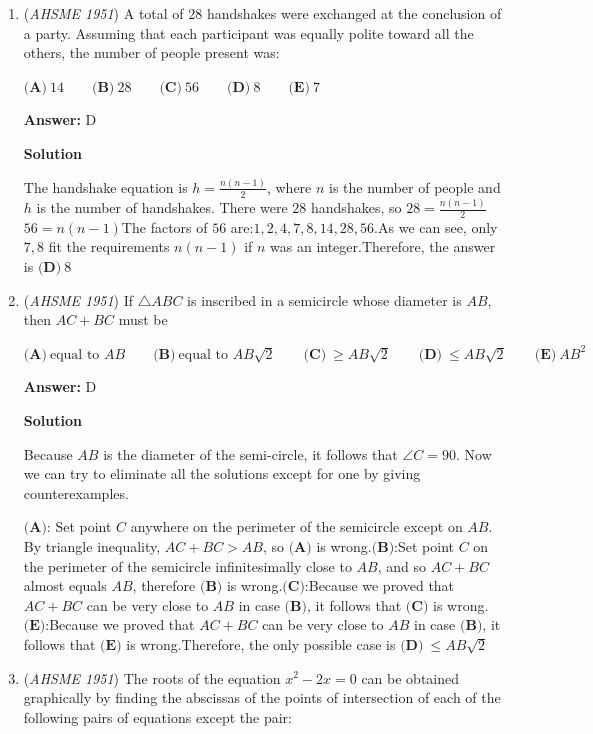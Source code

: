 \begin{enumerate}
	\item (\textit{AHSME 1951}) A total of $28$ handshakes were exchanged at the conclusion of a party. Assuming that each participant was equally polite toward all the others, the number of people present was: 


 $\textbf{(A)}\ 14\qquad\textbf{(B)}\ 28\qquad\textbf{(C)}\ 56\qquad\textbf{(D)}\ 8\qquad\textbf{(E)}\ 7$

 \textbf{Answer: }D



\textbf{Solution}

The handshake equation is $h=\frac{n(n-1)}{2}$, where $n$ is the number of people and $h$ is the number of handshakes. There were $28$ handshakes, so $28=\frac{n(n-1)}{2}$$56=n(n-1)$The factors of $56$ are:$1, 2, 4, 7, 8, 14, 28, 56$.As we can see, only $7, 8$ fit the requirements $n(n-1)$ if $n$ was an integer.Therefore, the answer is $\textbf{(D)}\ 8$



	\item (\textit{AHSME 1951}) If $\triangle ABC$ is inscribed in a semicircle whose diameter is $AB$, then $AC+BC$ must be 


 $\textbf{(A)}\ \text{equal to }AB\qquad\textbf{(B)}\ \text{equal to }AB\sqrt{2}\qquad\textbf{(C)}\ \geq AB\sqrt{2}\qquad\textbf{(D)}\ \leq AB\sqrt{2} \qquad \textbf{(E)}\ AB^{2}$

 \textbf{Answer: }D



\textbf{Solution}

Because $AB$ is the diameter of the semi-circle, it follows that $\angle C = 90$. Now we can try to eliminate all the solutions except for one by giving counterexamples.

 $\textbf{(A):}$ Set point $C$ anywhere on the perimeter of the semicircle except on $AB$. By triangle inequality, $AC+BC>AB$, so $\textbf{(A)}$ is wrong.$\textbf{(B):}$Set point $C$ on the perimeter of the semicircle infinitesimally close to $AB$, and so $AC+BC$ almost equals $AB$, therefore $\textbf{(B)}$ is wrong.$\textbf{(C):}$Because we proved that $AC+BC$ can be very close to $AB$ in case $\textbf{(B)}$, it follows that $\textbf{(C)}$ is wrong.$\textbf{(E):}$Because we proved that $AC+BC$ can be very close to $AB$ in case $\textbf{(B)}$, it follows that $\textbf{(E)}$ is wrong.Therefore, the only possible case is $\boxed{\textbf{(D)}\ \leq AB\sqrt{2}}$



	\item (\textit{AHSME 1951}) The roots of the equation $x^{2}-2x = 0$ can be obtained graphically by finding the abscissas of the points of intersection of each of the following pairs of equations except the pair: 



\end{enumerate}

